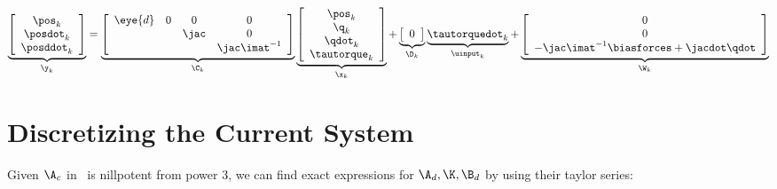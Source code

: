 \begin{gather}
  \label{eqn:ss_ee_observer}
  \underbrace{\left[
      \begin{array}{c}
        \pos_k \\
        \posdot_k \\
        \posddot_k
      \end{array}\right]}_{\y_k}=
  \underbrace{\left[
      \begin{array}{cccc}
        \eye{d} & 0 & 0 & 0 \\
                && \jac & 0  \\
                &&& \jac \imat^{-1}
      \end{array}\right]}_{\C_k}
  \underbrace{\left[
      \begin{array}{c}
        \pos_k\\
        \q_k\\
        \qdot_k\\
        \tautorque_k
      \end{array}\right]}_{\x_k}
  + \underbrace{\left[
      \begin{array}{c}
        0
      \end{array}\right]}_{\D_k}
  \underbrace{\tautorquedot_{k}}_{\uinput_k}
  + \underbrace{\left[
      \begin{array}{c}
        0 \\
        0 \\
        -\jac\imat^{-1}\biasforces + \jacdot \qdot
      \end{array}\right]}_{\W_k}
\end{gather}

\section{Discretizing the Current System}
\label{sec:discretization_lti_current_system}

Given $\A_c$ in~ is nillpotent from power 3, we can find
exact expressions for $\A_d,\K, \B_d$ by using their taylor series:

